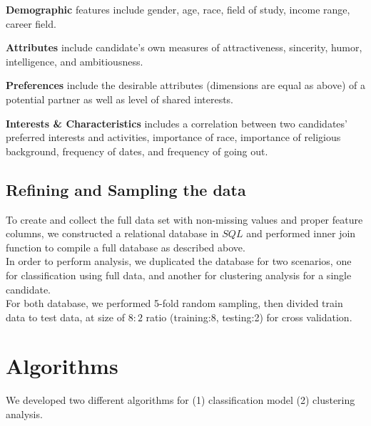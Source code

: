 \documentclass[11pt,letterpaper]{article}
\begin{document}
\textbf{Demographic} features include gender, age, race, field of study, income	range, career field.

\textbf{Attributes} include candidate's own measures of attractiveness, sincerity, humor, intelligence, and ambitiousness.

\textbf{Preferences} include the desirable attributes (dimensions are equal as above) of a potential partner as well as level of shared interests.

\textbf{Interests \& Characteristics} includes a correlation between two candidates' preferred interests and activities, importance of race, importance of religious background, frequency of dates, and frequency of going out.

\subsection{Refining and Sampling the data}

To create and collect the full data set with non-missing values and proper feature columns, we constructed a relational database in $SQL$ and performed inner join function to compile a full database as described above.\\

In order to perform analysis, we duplicated the database for two scenarios, one for classification using full data, and another for clustering analysis for a single candidate.\\

For both database, we performed 5-fold random sampling, then divided train data to test data, at size of $8:2$ ratio (training:8, testing:2) for cross validation.\\

\section{Algorithms}
We developed two different algorithms for (1) classification model (2) clustering analysis.
\end{document}
